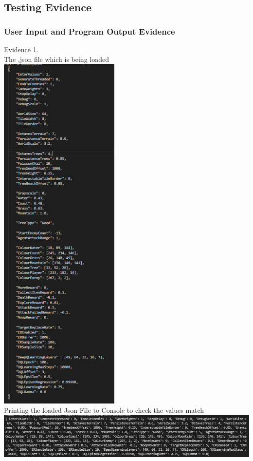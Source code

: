 \pagebreak
\vspace{1cm}
\subsection{Testing Evidence}
\vspace{0.5cm}

\subsubsection{User Input and Program Output Evidence}

\setcounter{magicrownumbers}{0}
\normalsize
\begin{center}
    {\large Evidence 1.\rn }\\ 
    \vspace{0.3cm}
    The .json file which is being loaded \\
    \includegraphics[width=6cm]{Images/Testing/T1.1.1.PNG} \\
    Printing the loaded Json File to Console to check the values match\\
    \includegraphics[width=16cm]{Images/Testing/T1.1.2.PNG} \\
    \vspace{1cm}


\end{center}
